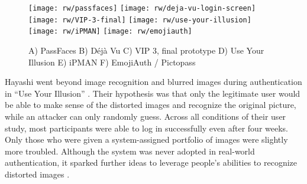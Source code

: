 	\begin{figure}[h]
		\centering
		\texttt{[image: rw/passfaces]}
		\texttt{[image: rw/deja-vu-login-screen]}
		\texttt{[image: rw/VIP-3-final]}
		\texttt{[image: rw/use-your-illusion]}
		\texttt{[image: rw/iPMAN]}
		\texttt{[image: rw/emojiauth]}
		\caption{\label{fig:rw:searchmetric} A) PassFaces B) Déjà Vu C) VIP 3, final prototype D) Use Your Illusion E) iPMAN F) EmojiAuth / Pictopass}
	\end{figure}
	
	Hayashi \etal went beyond image recognition and blurred images during authentication in ``Use Your Illusion'' \cite{Hayashi2008UseYourIllusion}. Their hypothesis was that only the legitimate user would be able to make sense of the distorted images and recognize the original picture, while an attacker can only randomly guess. Across all conditions of their user study, most participants were able to log in successfully even after four weeks. Only those who were given a system-assigned portfolio of images were slightly more troubled. Although the system was never adopted in real-world authentication, it sparked further ideas to leverage people's abilities to recognize distorted images \cite[http://arima.okoze.net/illusion/]{Castelluccia2017ImplicitVisual}. 
	
	
